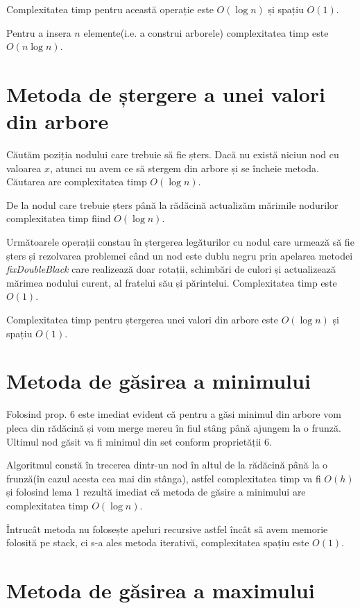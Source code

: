 \documentclass[]{report}
\begin{document}
	Complexitatea timp pentru această operație este $O(\log n)$ și spațiu $O(1)$.

	Pentru a insera $n$ elemente(i.e. a construi arborele) complexitatea timp
	este $O(n\log n)$.

	\section*{Metoda de ștergere a unei valori din arbore}

	Căutăm poziția nodului care trebuie să fie șters. Dacă nu există niciun nod
	cu valoarea $x$, atunci nu avem ce să stergem din arbore și se încheie metoda.
	Căutarea are complexitatea timp $O(\log n)$.

	De la nodul care trebuie șters până la rădăcină actualizăm mărimile nodurilor
	complexitatea timp fiind $O(\log n)$.

	Următoarele operații constau în ștergerea legăturilor cu nodul care urmează să
	fie șters și rezolvarea problemei când un nod este dublu negru prin apelarea
	metodei \emph{fixDoubleBlack} care realizează doar rotații, schimbări de culori
	și actualizează mărimea nodului curent, al fratelui său și părintelui.
	Complexitatea timp este $O(1)$.

	Complexitatea timp pentru ștergerea unei valori din arbore este $O(\log n)$
	și spațiu $O(1)$.

	\section*{Metoda de găsirea a minimului}

	Folosind prop. 6 este imediat evident că pentru a găsi minimul din arbore vom
	pleca din rădăcină și vom merge mereu în fiul stâng până ajungem la o frunză.
	Ultimul nod găsit va fi minimul din set conform proprietății 6.

	Algoritmul constă în trecerea dintr-un nod în altul de la rădăcină până la o
	frunză(în cazul acesta cea mai din stânga), astfel complexitatea timp va fi
	$O(h)$ și folosind lema 1 rezultă imediat că metoda de găsire a minimului
	are complexitatea timp $O(\log n)$.

	Întrucât metoda nu folosește apeluri recursive astfel încât să avem memorie
	folosită pe stack, ci s-a ales metoda iterativă, complexitatea spațiu este
	$O(1)$.

	\section*{Metoda de găsirea a maximului}
\end{document}
